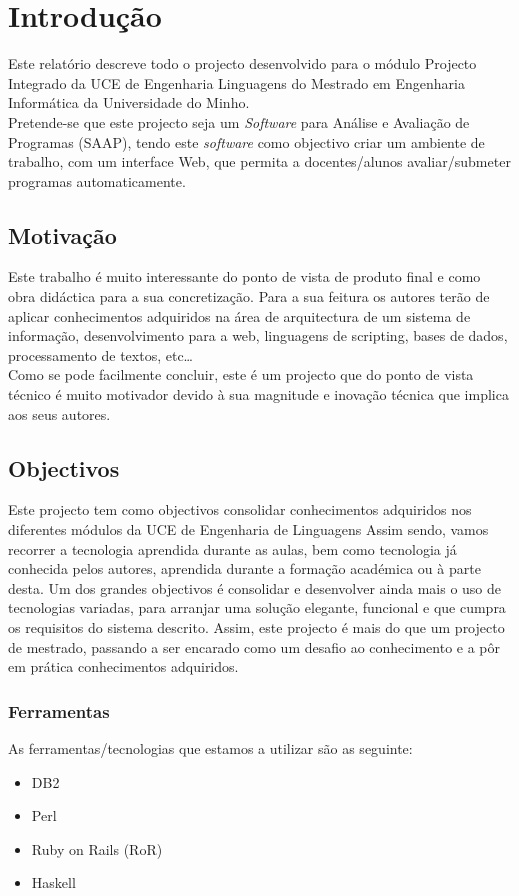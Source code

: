 \chapter{Introdução} \label{chap int}
\minitoc
Este relatório descreve todo o projecto desenvolvido para o módulo Projecto Integrado da UCE de Engenharia Linguagens do Mestrado em Engenharia Informática da Universidade do Minho.\\

Pretende-se que este projecto seja um \emph{Software} para Análise e Avaliação de Programas (SAAP), tendo este \emph{software} como objectivo criar um 
ambiente de trabalho, com um interface Web, que permita a docentes/alunos avaliar/submeter programas automaticamente.

\section{Motivação}
Este trabalho é muito interessante do ponto de vista de produto final e como obra didáctica para a sua concretização. Para a sua feitura os autores terão de aplicar
conhecimentos adquiridos na área de arquitectura de um sistema de informação, desenvolvimento para a web, linguagens de scripting, bases de dados, processamento de textos, etc\ldots\\
Como se pode facilmente concluir, este é um projecto que do ponto de vista técnico é muito motivador devido à sua magnitude e inovação técnica que implica aos seus autores.

\section{Objectivos}
Este projecto tem como objectivos consolidar conhecimentos adquiridos nos diferentes módulos da UCE de Engenharia de Linguagens
Assim sendo, vamos recorrer a tecnologia aprendida durante as aulas, bem como tecnologia já conhecida pelos autores, aprendida durante a formação académica ou à parte desta.
Um dos grandes objectivos é consolidar e desenvolver ainda mais o uso de tecnologias variadas, para arranjar uma solução elegante, funcional e que cumpra os requisitos do sistema descrito.
Assim, este projecto é mais do que um projecto de mestrado, passando a ser encarado como um desafio ao conhecimento e a pôr em prática conhecimentos adquiridos.

\subsection{Ferramentas}
As ferramentas/tecnologias que estamos a utilizar são as seguinte:
\begin{itemize}
\item DB2
\item Perl
\item Ruby on Rails (RoR)
\item Haskell
\end{itemize}

